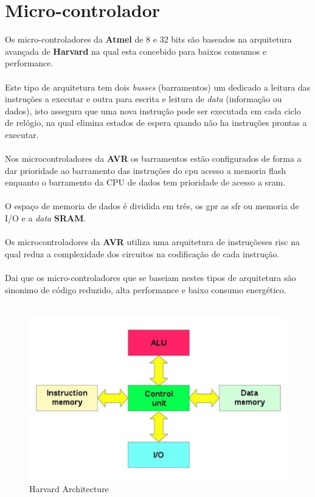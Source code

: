\section{Micro-controlador}
Os micro-controladores da \textbf{Atmel} de 8 e 32 bits são baseados na arquitetura avançada de \textbf{Harvard} na qual esta concebido para baixos consumos e performance.
\\
\\
Este tipo de arquitetura tem dois  \textit{busses} (barramentos) um dedicado a leitura das instruções a executar e outra para escrita e leitura de \textit{data} (informação ou dados), isto assegura que uma nova instrução pode ser executada em cada ciclo de relógio, na qual elimina estados de espera quando não ha instruções prontas a executar.
\\
\\
Nos microcontroladores da \textbf{AVR} os barramentos estão configurados de forma a dar prioridade ao barramento das instruções do \ac{cpu} acesso a memoria flash enquanto o barramento da CPU de dados tem prioridade de acesso a \ac{sram}.
\\
\\
O espaço de memoria de dados é dividida em três, os \ac{gpr} as \ac{sfr} ou memoria de I/O e a \textit{data} \textbf{SRAM}.
\\
\\
Os microcontroladores da \textbf{AVR} utiliza uma arquitetura de instruçõeses \ac{risc} na qual reduz a complexidade dos circuitos na codificação de cada instrução.
\\
\\
Dai que os micro-controladores que se baseiam nestes tipos de arquitetura são sinonimo de código reduzido, alta performance e baixo consumo energético.
\\
\\
\begin{figure}[H]
	\centering
	\includegraphics[scale=1]{./image/PESTA/Diagrama/Harvard_architecture.jpg}
	\caption{Harvard Architecture}
	\label{Harvard_architecture}
\end{figure}

